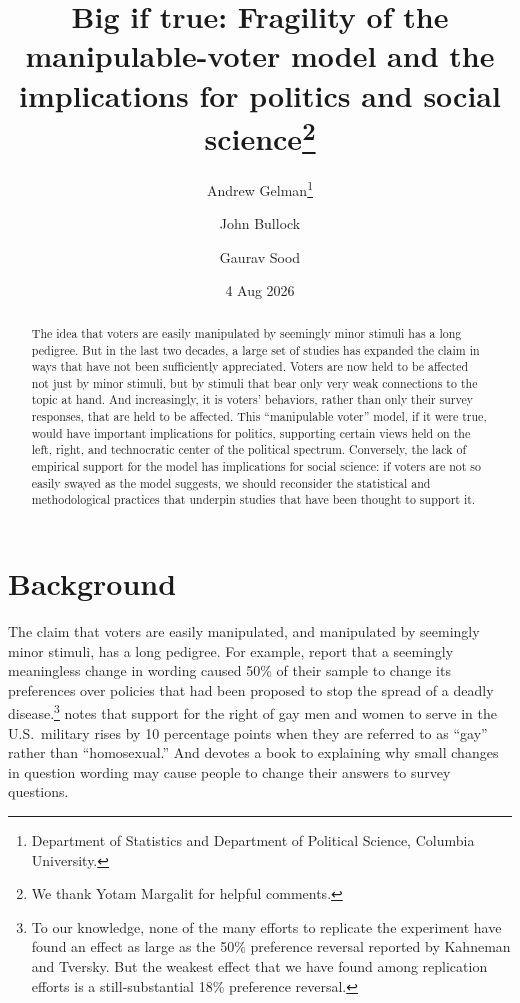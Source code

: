 \documentclass[11pt,letterpaper]{article}
\title{Big if true: Fragility of the manipulable-voter model and the implications for politics and social science\thanks{We thank Yotam Margalit for helpful comments.}}
\author{Andrew Gelman\thanks{Department of Statistics and Department of Political Science, Columbia University.} \and John Bullock \and Gaurav Sood}
\date{4 Aug 2026}
\begin{document}
\maketitle
\begin{abstract}
\noindent The idea that voters are easily manipulated by seemingly minor stimuli
has a long pedigree. But in the last two decades, a large set of studies has
expanded the claim in ways that have not been sufficiently appreciated. Voters
are now held to be affected not just by minor stimuli, but by stimuli that bear
only very weak connections to the topic at hand. And increasingly, it is
voters' behaviors, rather than only their survey responses, that are held to be
affected. This ``manipulable voter'' model, if it were true, would have
important implications for politics, supporting certain views held on the left,
right, and technocratic center of the political spectrum. Conversely, the lack
of empirical support for the model has implications for social science: if
voters are not so easily swayed as the model suggests, we should reconsider the
statistical and methodological practices that underpin studies that have been
thought to support it.
\end{abstract}

\section{Background}

The claim that voters are easily manipulated, and manipulated by seemingly minor
stimuli, has a long pedigree. For example, \citet{kahneman1982} report that a
seemingly meaningless change in wording caused 50\% of their sample to change
its preferences over policies that had been proposed to stop the spread of a
deadly disease.\footnote{To our knowledge, none of the many efforts to replicate
the experiment have found an effect as large as the 50\% preference reversal
reported by Kahneman and Tversky. But the weakest effect that we have found
among replication efforts is a still-substantial 18\% preference reversal.}
\citet{bishop2004} notes that support for the right of gay men and women to
serve in the U.S.\ military rises by 10 percentage points when they are referred
to as ``gay'' rather than ``homosexual.'' And \citet{zaller1992} devotes a book
to explaining why small changes in question wording may cause people to change
their answers to survey questions.
\end{document}

